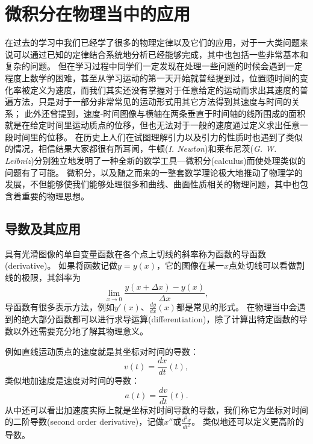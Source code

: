 
\chapter{微积分在物理当中的应用}


在过去的学习中我们已经学了很多的物理定律以及它们的应用，对于一大类问题来说可以通过已知的定律结合系统地分析已经能够完成，其中也包括一些非常基本和复杂的问题。
但在学习过程中同学们一定发现在处理一些问题的时候会遇到一定程度上数学的困难，甚至从学习运动的第一天开始就普经提到过，位置随时间的变化率被定义为速度，而我们其实还没有掌握对于任意给定的运动而求出其速度的普遍方法，只是对于一部分非常常见的运动形式用其它方法得到其速度与时间的关系；
此外还曾提到，速度-时间图像与横轴在两条垂直于时间轴的线所围成的面积就是在给定时间里运动质点的位移，但也无法对于一般的速度通过定义求出任意一段时间里的位移。
在历史上人们在试图理解引力以及引力的性质时也遇到了类似的情况，相信结果大家都很有所耳闻，牛顿({\it I. Newton})和莱布尼茨({\it G. W. Leibniz})分别独立地发明了一种全新的数学工具---{\heiti 微积分}(calculus)而使处理类似的问题有了可能。
微积分，以及随之而来的一整套数学理论极大地推动了物理学的发展，不但能够使我们能够处理很多和曲线、曲面性质相关的物理问题，其中也包含着重要的物理思想。

\section{导数及其应用}

具有光滑图像的单自变量函数在各个点上切线的斜率称为函数的{\heiti 导函数}(derivative)。
如果将函数记做$y = y(x)$，它的图像在某一$x$点处切线可以看做割线的极限，其斜率为
\begin{equation}\label{key}
\lim_{x\rightarrow 0}\frac{y(x+\Delta x)-y(x)}{\Delta x},
\end{equation}
导函数有很多表示方法，例如$y'(x)$、$\frac{dy}{dx}(x)$都是常见的形式。
在物理当中会遇到的绝大部分函数都可以进行{\heiti 求导运算}(differentiation)，除了计算出特定函数的导数以外还需要充分地了解其物理意义。

例如直线运动质点的速度就是其坐标对时间的导数：
\begin{equation}\label{key}
v(t) = \frac{dx}{dt}(t),
\end{equation}
类似地加速度是速度对时间的导数：
\begin{equation}\label{key}
a(t) = \frac{dv}{dt}(t).
\end{equation}
从中还可以看出加速度实际上就是坐标对时间导数的导数，我们称它为坐标对时间的{\heiti 二阶导数}(second order derivative)，记做$x''$或$\frac{d^2x}{dt^2}$。
类似地还可以定义更高阶的导数。

